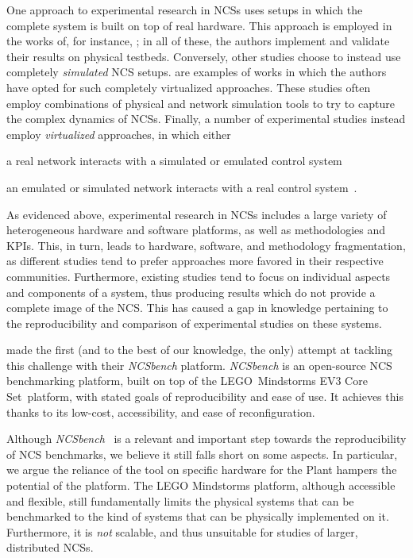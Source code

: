 One approach to experimental research in \acp{NCS} uses setups in which the complete system is built on top of real hardware.
This approach is employed in the works of, for instance, \textcite{Li2014Wireless,Baumann2018LowPower,Cuenca2019UAV}; in all of these, the authors implement and validate their results on physical testbeds.
Conversely, other studies choose to instead use completely \emph{simulated} \ac{NCS} setups.
\textcite{Wu2012NPC,Chen2015synccontrol,Ma2019DynamicSched} are examples of works in which the authors have opted for such completely virtualized approaches.
These studies often employ combinations of physical and network simulation tools to try to capture the complex dynamics of \acp{NCS}.
Finally, a number of experimental studies instead employ \emph{virtualized} approaches, in which either
\begin{enumerate*}[itemjoin={{; }}, itemjoin*={{; or }}]
    \item a real network interacts with a simulated or emulated control system~\cite{Wang2020VoltageControl}
    \item an emulated or simulated network interacts with a real control system~\cite{Natale2004InvPendEthernet}.
\end{enumerate*}

As evidenced above, experimental research in \acp{NCS} includes a large variety of heterogeneous hardware and software platforms, as well as methodologies and \aclp*{KPI}.
This, in turn, leads to hardware, software, and methodology fragmentation, as different studies tend to prefer approaches more favored in their respective communities.
Furthermore, existing studies tend to focus on individual aspects and components of a system, thus producing results which do not provide a complete image of the \ac{NCS}.
This has caused a gap in knowledge pertaining to the reproducibility and comparison of experimental studies on these systems.

\textcite{Zoppi2020NCSBench} made the first (and to the best of our knowledge, the only) attempt at tackling this challenge with their \emph{NCSbench} platform.
\emph{NCSbench} is an open-source \ac{NCS} benchmarking platform, built on top of the LEGO\textregistered{}\ Mindstorms EV3 Core Set\texttrademark{}\ platform, with stated goals of reproducibility and ease of use.
It achieves this thanks to its low-cost, accessibility, and ease of reconfiguration.

Although \emph{NCSbench}~\cite{Zoppi2020NCSBench} is a relevant and important step towards the reproducibility of \ac{NCS} benchmarks, we believe it still falls short on some aspects.
In particular, we argue the reliance of the tool on specific hardware for the Plant hampers the potential of the platform.
The LEGO Mindstorms platform, although accessible and flexible, still fundamentally limits the physical systems that can be benchmarked to the kind of systems that can be physically implemented on it.
Furthermore, it is \emph{not} scalable, and thus unsuitable for studies of larger, distributed \acp{NCS}.


